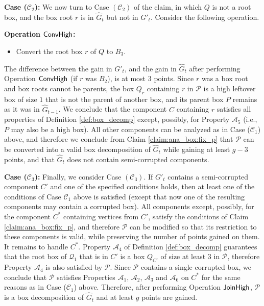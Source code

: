 \documentclass[11pt]{article}
\def\dnsitem{\vspace{-7pt}\item}
\theoremstyle{definition}
\def\decomponereg{\mathcal{A}_1}
\def\decomponecorr{\mathcal{A}_2}
\def\decomproot{\mathcal{A}_3}
\def\decompsize{\mathcal{A}_4}
\def\decompcleanl{\mathcal{A}_5}
\def\decompedges{\mathcal{A}_6}
\def\boxpropnocorhigh{\mathcal{C}_1}
\def\boxpropnocorlow{\mathcal{C}_2}
\def\boxpropcor{\mathcal{C}_3}
\def\joinhigh{\mbox{\sf JoinHigh}}
\def\convhigh{\mbox{\sf ConvHigh}}
\begin{document}
\bigskip
\par\noindent
{\bf Case ($\boxpropnocorlow$):}
We now turn to Case $(\boxpropnocorlow)$ of the claim, in which $Q$ is not a root box, and the box root $r$ is in $\hat{G}_t$ but not in $G'_t$.
Consider the following operation.
\smallskip
\par\noindent
{\bf Operation $\convhigh$:}
\begin{itemize}
\dnsitem[] Convert the root box $r$ of $Q$ to $B_3$.
\end{itemize}
The difference between the gain in $G'_t$, and the gain in $\hat{G}_t$ after performing Operation $\convhigh$ (if $r$ was $B_2$), is at most $3$ points.
Since $r$ was a box root and box roots cannot be parents, the box $Q_r$ containing $r$ in $\mathcal{P}$ is a high leftover box of size $1$ that is not the parent of another box, 
and its parent box $P$ remains as it was in $\hat{G}_{t-1}$.
We conclude that the component $C$ containing $r$ satisfies all properties of Definition \ref{def:box_decomp} except, possibly, for Property $\decompcleanl$ (i.e., $P$ may also be a high box).
All other components can be analyzed as in Case ($\boxpropnocorhigh$) above, and therefore we conclude from Claim \ref{claim:ana_box:fix_p} that $\mathcal{P}$ can be converted into a valid box decomposition of $\hat{G}_t$ while gaining at least $g - 3$ points, and that $\hat{G}_t$ does not contain semi-corrupted components.

\bigskip
\par\noindent
{\bf Case ($\boxpropcor$):}
Finally, we consider Case $(\boxpropcor)$. 
If $G'_t$ contains a semi-corrupted component $C'$ and one of the specified conditions holds, then at least one of the conditions of Case $\boxpropnocorhigh$ above is satisfied (except that now one of the resulting components may contain a corrupted box).
All components except, possibly, for the component $C^*$ containing vertices from $C'$, satisfy the conditions of Claim \ref{claim:ana_box:fix_p}, and therefore $\mathcal{P}$ can be modified so that its restriction to these components is valid, while preserving the number of points gained on them.
It remains to handle $C^*$.
Property $\decompsize$ of Definition \ref{def:box_decomp} guarantees that the root box of $\mathcal{Q}_1$ that is in $C'$ is a box $Q_{C'}$ of size at least $3$ in $\mathcal{P}$,
therefore Property $\decompsize$ is also satisfied by $\mathcal{P}$. 
Since $\mathcal{P}$ contains a single corrupted box, we conclude that $\mathcal{P}$ satisfies Properties $\decomponereg$, $\decomponecorr$, $\decomproot$ and $\decompedges$ on $C^*$ for the same reasons as in Case ($\boxpropnocorhigh$) above.
Therefore, after performing Operation $\joinhigh$, $\mathcal{P}$ is a box decomposition of $\hat{G}_t$ and at least $g$ points are gained. 
\end{document}
